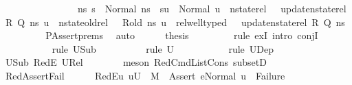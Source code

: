 \begin{isabellebody}
\ \ \ \ \ \ \ \ \ \ \ \ \ \ \ \ {\isacharparenleft}{\kern0pt}{\isasymforall}ns{\isacharprime}{\kern0pt}{\isachardot}{\kern0pt}\ s{\isacharprime}{\kern0pt}\ {\isacharequal}{\kern0pt}\ Normal\ ns{\isacharprime}{\kern0pt}\ {\isasymlongrightarrow}\ su\ {\isacharequal}{\kern0pt}\ Normal\ u\ {\isasymand}\ nstate{\isacharunderscore}{\kern0pt}rel\ {\isasymLambda}\ {\isasymLambda}{\isacharprime}{\kern0pt}\ {\isacharparenleft}{\kern0pt}update{\isacharunderscore}{\kern0pt}nstate{\isacharunderscore}{\kern0pt}rel\ R\ Q{\isacharparenright}{\kern0pt}\ ns{\isacharprime}{\kern0pt}\ u\ {\isasymand}\ nstate{\isacharunderscore}{\kern0pt}old{\isacharunderscore}{\kern0pt}rel\ {\isasymLambda}\ {\isasymLambda}{\isacharprime}{\kern0pt}\ R{\isacharunderscore}{\kern0pt}old\ ns{\isacharprime}{\kern0pt}\ u\ {\isasymand}\ rel{\isacharunderscore}{\kern0pt}well{\isacharunderscore}{\kern0pt}typed\ {\isasymLambda}\ {\isasymOmega}\ {\isacharparenleft}{\kern0pt}update{\isacharunderscore}{\kern0pt}nstate{\isacharunderscore}{\kern0pt}rel\ R\ Q{\isacharparenright}{\kern0pt}\ ns{\isacharprime}{\kern0pt}{\isacharparenright}{\kern0pt}\ {\isacharparenright}{\kern0pt}{\isachardoublequoteclose}\isanewline
\ \ \ \ \ \ \isamarkupfalse%
\ PAssert{\isachardot}{\kern0pt}prems\ \isamarkupfalse%
\ auto\isanewline
\ \ \ \ \isamarkupfalse%
\ {\isacharquery}{\kern0pt}thesis\ \isanewline
\ \ \ \ \ \ \isamarkupfalse%
\ {\isacharparenleft}{\kern0pt}rule\ exI{\isacharcomma}{\kern0pt}\ intro\ conjI{\isacharparenright}{\kern0pt}\isanewline
\ \ \ \ \ \ \ \ \ \isamarkupfalse%
\ {\isacharparenleft}{\kern0pt}rule\ U{}Sub{\isacharparenright}{\kern0pt}\isanewline
\ \ \ \ \ \ \ \ \isamarkupfalse%
\ {\isacharparenleft}{\kern0pt}rule\ {\isacartoucheopen}U{}\ {\isasymnoteq}\ {\isacharbraceleft}{\kern0pt}{\isacharbraceright}{\kern0pt}{\isacartoucheclose}{\isacharparenright}{\kern0pt}\isanewline
\ \ \ \ \ \ \ \isamarkupfalse%
\ {\isacharparenleft}{\kern0pt}rule\ U{}Dep{\isacharparenright}{\kern0pt}\isanewline
\ \ \ \ \ \ \isamarkupfalse%
\ U{}Sub\ RedE{}\ U{}Rel\isanewline
\ \ \ \ \ \ \isamarkupfalse%
\ {\isacharparenleft}{\kern0pt}meson\ RedCmdListCons\ subsetD{\isacharparenright}{\kern0pt}\isanewline
\ \ \isamarkupfalse%
\isanewline
\ \ \ \ \isamarkupfalse%
\ RedAssertFail\isanewline
\ \ \ \ \isamarkupfalse%
\ RedE{}{\isacharcolon}{\kern0pt}{\isachardoublequoteopen}{\isasymAnd}u{\isachardot}{\kern0pt}\ u{\isasymin}U{}\ {\isasymLongrightarrow}\ M{\isacharcomma}{\kern0pt}{\isasymLambda}{\isacharprime}{\kern0pt}{\isacharcomma}{\kern0pt}{\isasymGamma}{\isacharcomma}{\kern0pt}{\isasymOmega}\ {\isasymturnstile}\ {\isasymlangle}Assert\ e{}{\isacharcomma}{\kern0pt}Normal\ u{\isasymrangle}\ {\isasymrightarrow}\ Failure{\isachardoublequoteclose}\ \isanewline

\end{isabellebody}
